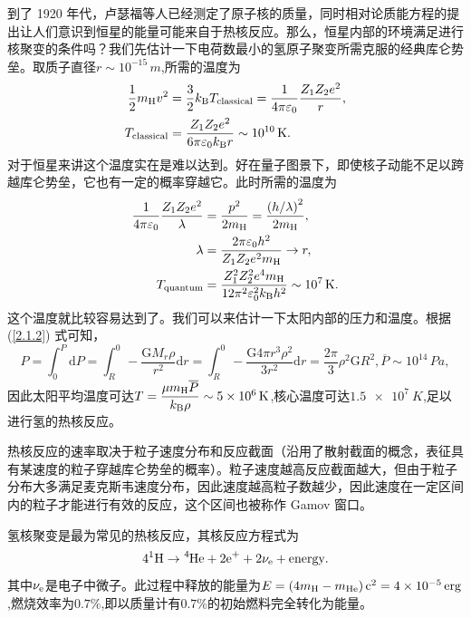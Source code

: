 \documentclass[../天体物理基础.tex]{subfiles}
\begin{document}
到了 1920 年代，卢瑟福等人已经测定了原子核的质量，同时相对论质能方程的提出让人们意识到恒星的能量可能来自于热核反应。那么，恒星内部的环境满足进行核聚变的条件吗？我们先估计一下电荷数最小的氢原子聚变所需克服的经典库仑势垒。取质子直径$r\sim10^{-15}\,\unit{m}$,所需的温度为
\begin{align}
\frac{1}{2}m_{\ce{H}}v^{2}&=\frac{3}{2}k_{\text{B}}T_{\text{classical}}=\frac{1}{4\pi\varepsilon_{0}}\frac{Z_{1}Z_{2}e^{2}}{r},\\
T_{\text{classical}}&=\frac{Z_{1}Z_{2}e^{2}}{6\pi\varepsilon_{0}k_{\text{B}}r}\sim10^{10}\,\unit{K}.
\end{align}
对于恒星来讲这个温度实在是难以达到。好在量子图景下，即使核子动能不足以跨越库仑势垒，它也有一定的概率穿越它。此时所需的温度为
\begin{align}
\frac{1}{4\pi\varepsilon_{0}}\frac{Z_{1}Z_{2}e^{2}}{\lambda}&=\frac{p^{2}}{2m_{\ce{H}}}=\frac{\left(h/\lambda\right)^{2}}{2m_{\ce{H}}},\\
\lambda&=\frac{2\pi\varepsilon_{0}h^{2}}{Z_{1}Z_{2}e^{2}m_{\ce{H}}}\to r,\\
T_{\text{quantum}}&=\frac{Z_{1}^{2}Z_{2}^{2}e^{4}m_{\ce{H}}}{12\pi^{2}\varepsilon_{0}^{2}k_{\text{B}}h^{2}}\sim10^{7}\,\unit{K}.
\end{align}
这个温度就比较容易达到了。我们可以来估计一下太阳内部的压力和温度。根据 (\ref{2.1.2}) 式可知，
\begin{equation}
P=\int_{0}^{P}\mathrm{d}P=\int_{R}^{0}-\frac{\mathrm{G}M_{r}\rho}{r^{2}}\mathrm{d}r=\int_{R}^{0}-\frac{\mathrm{G}4\pi{}r^{3}\rho^{2}}{3r^{2}}\mathrm{d}r=\frac{2\pi{}}{3}\rho^{2}\mathrm{G}R^{2},\overline{P}\sim10^{14}\,\unit{Pa},
\end{equation}
因此太阳平均温度可达$T=\dfrac{\mu m_{\ce{H}}\overline{P}}{k_{\text{B}}\rho}\sim\qty{5e6}{K}$,核心温度可达$\qty{1.5e7}{K}$,足以进行氢的热核反应。

热核反应的速率取决于粒子速度分布和反应截面（沿用了散射截面的概念，表征具有某速度的粒子穿越库仑势垒的概率）。粒子速度越高反应截面越大，但由于粒子分布大多满足麦克斯韦速度分布，因此速度越高粒子数越少，因此速度在一定区间内的粒子才能进行有效的反应，这个区间也被称作 Gamov 窗口。

氢核聚变是最为常见的热核反应，其核反应方程式为
\begin{equation}
4{}^{1}\ce{H}\to\ce{^{4}He}+2\ce{e+}+2\nu_{\ce{e}}+\text{energy}.
\end{equation}
其中$\nu_{\ce{e}}$是电子中微子。此过程中释放的能量为$E=\left(4m_{\ce{H}}-m_{\ce{He}}\right)\mathrm{c}^{2}=\qty{4e-5}{erg}$,燃烧效率为$0.7\%$,即以质量计有$0.7\%$的初始燃料完全转化为能量。
\end{document}
